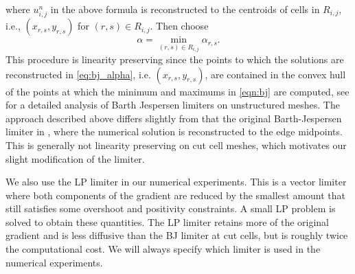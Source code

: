 where $u^n_{i,j}$ in the above formula is reconstructed to the centroids of cells in $R_{i,j}$, i.e., $(x_{r,s}, y_{r,s})$ for $(r,s)\in R_{i,j}$.
Then choose
\begin{equation}\label{eqn:alpha}
\alpha = \min_{(r,s) \in R_{i,j}} \alpha_{r,s} .
\end{equation}
This procedure is linearity preserving since the points to which the solutions are reconstructed in \eqref{eq:bj_alpha}, i.e. $(x_{r,s}, y_{r,s})$, are contained in the convex hull of the points at which the minimum and maximums in \eqref{eqn:bj} are computed, see \cite{giuliani2018analysis} for a detailed analysis of Barth Jespersen limiters on unstructured meshes.
The approach described above differs slightly from that the original Barth-Jespersen limiter in \cite{barth-jespersen}, where the numerical solution is reconstructed to the edge midpoints.  This is generally not linearity preserving on cut cell meshes, which motivates our slight modification of the limiter.  

We also use the LP limiter in our numerical experiments. This is a vector limiter where both components of the gradient are reduced by the smallest amount that still satisfies some overshoot and positivity constraints. A small LP problem is solved to  obtain these quantities.
The LP limiter retains more of the original gradient and is less diffusive than the BJ limiter at cut cells, but is roughly twice the computational cost. We will always specify which limiter is used in the numerical experiments.  

